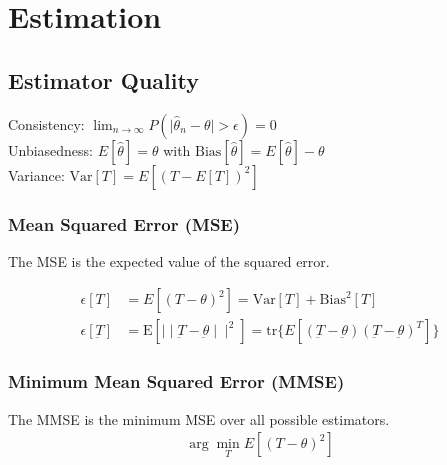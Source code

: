 \section{Estimation}
\begin{mdframed}[style=eqbox]
  \subsection{Estimator Quality}
  Consistency: $\lim_{n \rightarrow \infty} P(\mid \hat{\theta}_n - \theta \mid > \epsilon) = 0$\\
  Unbiasedness: $E[\hat{\theta}] = \theta$ with $\text{Bias}[\hat{\theta}] = E[\hat{\theta}] - \theta$\\
  Variance: $\text{Var}[T] = E[(T - E[T])^2]$
  \subsubsection{Mean Squared Error (MSE)}
  The MSE is the expected value of the squared error.
  \begin{mdframed}[style=redbox]
    \vspace*{-10pt}
    \begin{align*}
      \epsilon[T] &= E[(T - \theta)^2] = \text{Var}[T] + \text{Bias}^2[T]\\
      \epsilon[\underbar{T}] &= \text{E}[\mid\mid \underbar{T} - \underbar{\theta} \mid\mid^2] = \text{tr}\{E[(\underbar{T} - \underbar{\theta})(\underbar{T} - \underbar{\theta})^T]\}
    \end{align*}
  \end{mdframed}
  \subsubsection{Minimum Mean Squared Error (MMSE)}
  The MMSE is the minimum MSE over all possible estimators.
  \begin{align*}
    \arg \min_T E[(T - \theta)^2]
  \end{align*}
\end{mdframed}

